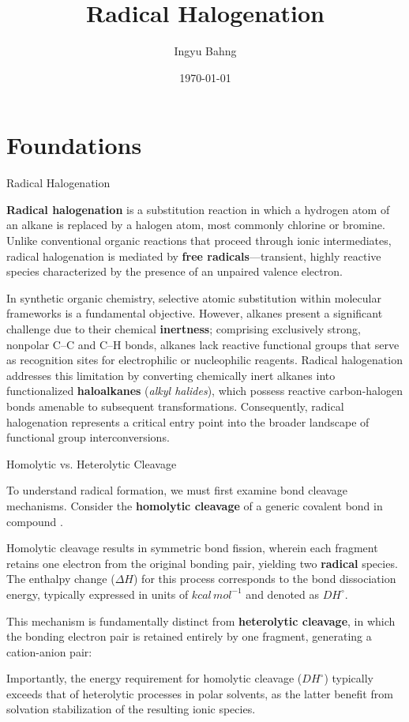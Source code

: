 \documentclass[10pt]{article}
\title{Radical Halogenation}
\date{\today}
\author{Ingyu Bahng}
\begin{document}


\section{Foundations}
  \label{sec:foundations}

  \begin{core}{Radical Halogenation}

    \textbf{Radical halogenation} is a substitution reaction in which a hydrogen atom of an alkane is replaced by a halogen atom, most commonly chlorine or bromine. Unlike conventional organic reactions that proceed through ionic intermediates, radical halogenation is mediated by \textbf{free radicals}---transient, highly reactive species characterized by the presence of an unpaired valence electron.

    In synthetic organic chemistry, selective atomic substitution within molecular frameworks is a fundamental objective. However, alkanes present a significant challenge due to their chemical \textbf{inertness}; comprising exclusively strong, nonpolar C--C and C--H bonds, alkanes lack reactive functional groups that serve as recognition sites for electrophilic or nucleophilic reagents. Radical halogenation addresses this limitation by converting chemically inert alkanes into functionalized \textbf{haloalkanes} (\textit{alkyl halides}), which possess reactive carbon-halogen bonds amenable to subsequent transformations. Consequently, radical halogenation represents a critical entry point into the broader landscape of functional group interconversions.

  \end{core}

  \begin{core}{Homolytic vs. Heterolytic Cleavage}

    To understand radical formation, we must first examine bond cleavage mechanisms. Consider the \textbf{homolytic cleavage} of a generic covalent bond in compound .


    Homolytic cleavage results in symmetric bond fission, wherein each fragment retains one electron from the original bonding pair, yielding two \textbf{radical} species. The enthalpy change ($\Delta H$) for this process corresponds to the bond dissociation energy, typically expressed in units of $kcal\,mol^{-1}$ and denoted as $DH^{\circ}$.

    This mechanism is fundamentally distinct from \textbf{heterolytic cleavage}, in which the bonding electron pair is retained entirely by one fragment, generating a cation-anion pair:


    Importantly, the energy requirement for homolytic cleavage ($DH^{\circ}$) typically exceeds that of heterolytic processes in polar solvents, as the latter benefit from solvation stabilization of the resulting ionic species.

  \end{core} 
\end{document}
